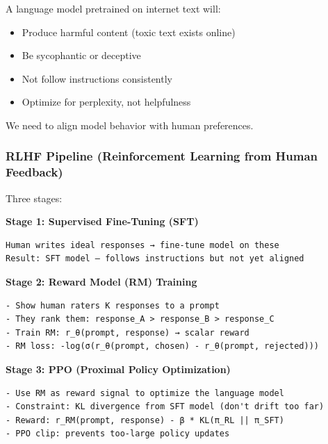 \documentclass[11pt]{article}
\providecommand{\tightlist}{\setlength{\itemsep}{1pt}\setlength{\parskip}{0pt}}
\begin{document}
A language model pretrained on internet text will:

\begin{itemize}
\tightlist
\item
  Produce harmful content (toxic text exists online)
\item
  Be sycophantic or deceptive
\item
  Not follow instructions consistently
\item
  Optimize for perplexity, not helpfulness
\end{itemize}

We need to align model behavior with human preferences.

\subsubsection{RLHF Pipeline (Reinforcement Learning from Human Feedback)}\label{rlhf-pipeline-reinforcement-learning-from-human-feedback}

Three stages:

\textbf{Stage 1: Supervised Fine-Tuning (SFT)}

\setcodelang{}

\begin{verbatim}
Human writes ideal responses → fine-tune model on these
Result: SFT model — follows instructions but not yet aligned
\end{verbatim}

\textbf{Stage 2: Reward Model (RM) Training}

\setcodelang{}

\begin{verbatim}
- Show human raters K responses to a prompt
- They rank them: response_A > response_B > response_C
- Train RM: r_θ(prompt, response) → scalar reward
- RM loss: -log(σ(r_θ(prompt, chosen) - r_θ(prompt, rejected)))
\end{verbatim}

\textbf{Stage 3: PPO (Proximal Policy Optimization)}

\setcodelang{}

\begin{verbatim}
- Use RM as reward signal to optimize the language model
- Constraint: KL divergence from SFT model (don't drift too far)
- Reward: r_RM(prompt, response) - β * KL(π_RL || π_SFT)
- PPO clip: prevents too-large policy updates
\end{verbatim}

\end{document}

